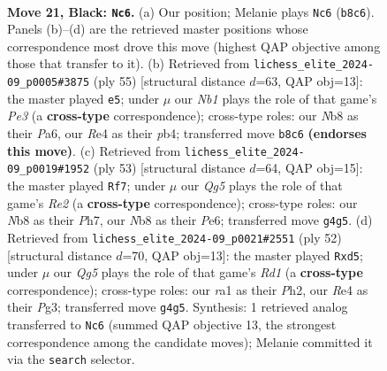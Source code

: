 \documentclass[11pt]{article}
\begin{document}
\clearpage

\begin{figure}[p]\centering
\begin{subfigure}{0.46\textwidth}\centering
\resizebox{\linewidth}{!}{%
\newchessgame
\chessboard[
  setfen={rn4k1/p4p1p/3B2p1/1Q6/4r1q1/8/P4P1P/R6K b - - 1 21},
  showmover=false,
  pgfstyle=straightmove, color=movearrow, markmove={b8-c6}
]}
\caption{}
\end{subfigure}\hfill
\begin{subfigure}{0.46\textwidth}\centering
\resizebox{\linewidth}{!}{%
\newchessgame
\chessboard[
  setfen={6k1/q3r1p1/p1Q1p2p/8/1PP5/P7/6PP/5R1K b - - 0 28},
  showmover=false,
  pgfstyle=straightmove, color=movearrow, markmove={e6-e5}
]}
\caption{}
\end{subfigure}
\\[4pt]
\begin{subfigure}{0.46\textwidth}\centering
\resizebox{\linewidth}{!}{%
\newchessgame
\chessboard[
  setfen={8/pp1kr2p/4p2Q/3nB3/8/7P/2q2PP1/5RK1 b - - 0 27},
  showmover=false,
  pgfstyle=straightmove, color=movearrow, markmove={e7-f7}
]}
\caption{}
\end{subfigure}\hfill
\begin{subfigure}{0.46\textwidth}\centering
\resizebox{\linewidth}{!}{%
\newchessgame
\chessboard[
  setfen={2r3k1/4pp1p/1QP3p1/3p4/P7/2q3P1/5P1P/3R2K1 w - - 3 27},
  showmover=false,
  pgfstyle=straightmove, color=movearrow, markmove={d1-d5}
]}
\caption{}
\end{subfigure}
\caption{\textbf{Move 21, Black: \texttt{Nc6}.} (a) Our position; Melanie plays \texttt{Nc6} (\texttt{b8c6}). Panels (b)--(d) are the retrieved master positions whose correspondence most drove this move (highest QAP objective among those that transfer to it). (b) Retrieved from \texttt{lichess\_elite\_2024-09\_p0005\#3875} (ply 55) [structural distance $d$=63, QAP obj=13]: the master played \texttt{e5}; under $\mu$ our \emph{Nb1} plays the role of that game's \emph{Pe3} (a \textbf{cross-type} correspondence); cross-type roles: our \emph{N}b8 as their \emph{P}a6, our \emph{R}e4 as their \emph{p}b4; transferred move \texttt{b8c6} \textbf{(endorses this move)}. (c) Retrieved from \texttt{lichess\_elite\_2024-09\_p0019\#1952} (ply 53) [structural distance $d$=64, QAP obj=15]: the master played \texttt{Rf7}; under $\mu$ our \emph{Qg5} plays the role of that game's \emph{Re2} (a \textbf{cross-type} correspondence); cross-type roles: our \emph{N}b8 as their \emph{P}h7, our \emph{N}b8 as their \emph{P}e6; transferred move \texttt{g4g5}. (d) Retrieved from \texttt{lichess\_elite\_2024-09\_p0021\#2551} (ply 52) [structural distance $d$=70, QAP obj=13]: the master played \texttt{Rxd5}; under $\mu$ our \emph{Qg5} plays the role of that game's \emph{Rd1} (a \textbf{cross-type} correspondence); cross-type roles: our \emph{r}a1 as their \emph{P}h2, our \emph{R}e4 as their \emph{P}g3; transferred move \texttt{g4g5}. Synthesis: 1 retrieved analog transferred to \texttt{Nc6} (summed QAP objective 13, the strongest correspondence among the candidate moves); Melanie committed it via the \texttt{search} selector.}
\label{fig:thought-m41}
\end{figure}
\end{document}
